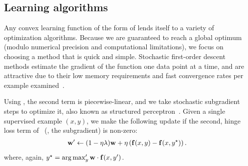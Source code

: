\subsection{Learning algorithms}\label{sec:learning-algs}

Any convex learning function of the form of  lends itself 
to a variety of optimization algorithms.  Because we are guaranteed to reach a 
global optimum (modulo numerical precision and computational limitations), we 
focus on choosing a method that is quick and simple.  Stochastic first-order 
descent methods estimate the gradient of the function one data point at a time, 
and are attractive due to their low memory requirements and fast convergence 
rates per example examined~\citep{shalev07}.

Using , the second term is piecewise-linear, and we take stochastic 
subgradient steps to optimize it, also known as structured 
perceptron~\citep{Collins2002}. Given a single supervised example $(x,y)$, we 
make the following update if the second, hinge loss term of~ (\ie, 
the subgradient) is non-zero:
\begin{align}
\mathbf{w}' \leftarrow (1-\eta\lambda)\mathbf{w} + \eta \left( \mathbf{f}(x,y) - \mathbf{f}(x,y^\star) \right).
\end{align}
where, again, $y^\star = \mathop{\arg\max}_y' \mathbf{w} \cdot \mathbf{f}(x,y')$.
